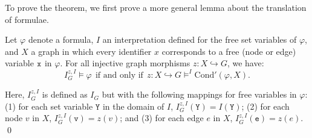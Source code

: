 \documentclass{llncs}
\begin{document}
	To prove the theorem, we first prove a more general lemma about the translation of formulae.
	
	
	\begin{lemma}\label{lemma:Cond}\rm
		Let $\varphi$ denote a formula, $I$ an interpretation defined for the free set variables of $\varphi$, and $X$ a graph in which every identifier $x$ corresponds to a free (node or edge) variable $\tt x$ in $\varphi$. For all injective graph morphisms $z\!:X\hookrightarrow G$, we have:
		\[ I_G^{z,I} \models \varphi\ \ \text{if and only if}\ \ z\!: X\hookrightarrow G \models^I \text{Cond}'(\varphi,X).\]

		\noindent Here, $I_G^{z,I}$ is defined as $I_G$ but with the following mappings for free variables in $\varphi$: (1) for each set variable $\mathtt{Y}$ in the domain of $I$, $I_G^{z,I} (\mathtt{Y}) = I(\mathtt{Y})$; (2) for each node $v$ in $X$, $I_G^{z,I} (\mathtt{v}) = z(v)$; and (3) for each edge $e$ in $X$, $I_G^{z,I} (\mathtt{e}) = z(e)$.
	\qed
	\end{lemma}
	
\end{document}
